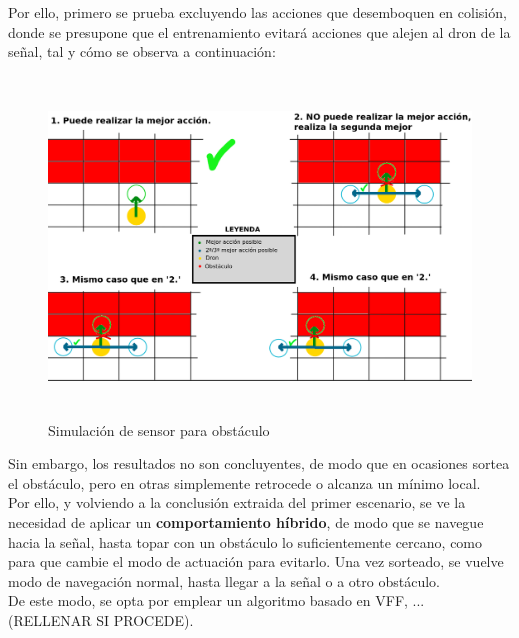 Por ello, primero se prueba excluyendo las acciones que desemboquen en colisión, donde se presupone que el entrenamiento evitará acciones que alejen al dron de la señal, tal y cómo se observa a continuación:

\begin{figure} [H]
    \begin{center}
    \includegraphics[height=9cm]{imagenes/cap4/28_pseudosensor.png}
    \end{center}
    \caption[Simulación de sensor para obstáculo]{Simulación de sensor para obstáculo}
    \label{fig:pseudosensor}
\end{figure}

Sin embargo, los resultados no son concluyentes, de modo que en ocasiones sortea el obstáculo, pero en otras simplemente retrocede o alcanza un mínimo local.\\

Por ello, y volviendo a la conclusión extraida del primer escenario, se ve la necesidad de aplicar un \textbf{comportamiento híbrido}, de modo que se navegue hacia la señal, hasta topar con un obstáculo lo suficientemente cercano, como para que cambie el modo de actuación para evitarlo. Una vez sorteado, se vuelve modo de navegación normal, hasta llegar a la señal o a otro obstáculo.\\

De este modo, se opta por emplear un algoritmo basado en \ac{VFF}, ... (RELLENAR SI PROCEDE).